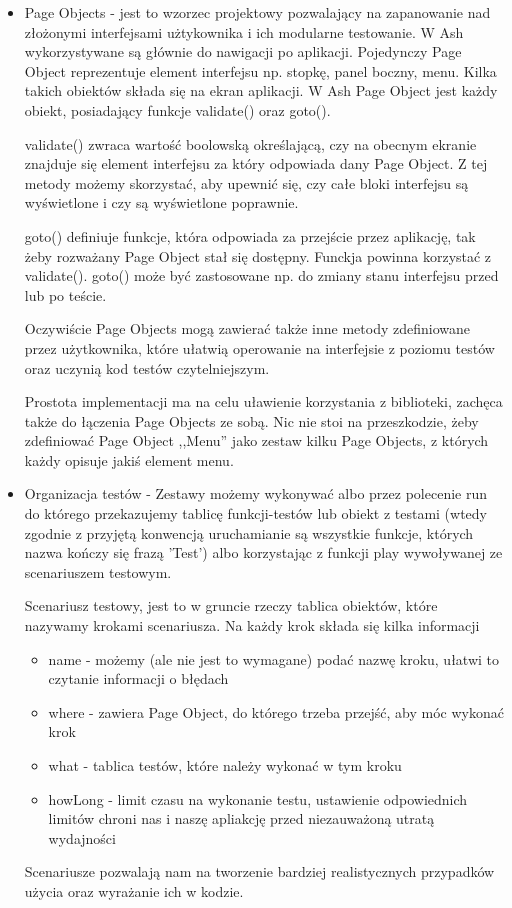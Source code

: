 \documentclass[brudnopis]{xmgr}
\begin{document}
\begin{itemize}
  \item Page Objects - jest to wzorzec projektowy pozwalający na zapanowanie nad złożonymi interfejsami użtykownika i ich modularne testowanie. W Ash wykorzystywane są głównie do nawigacji po aplikacji. Pojedynczy Page Object reprezentuje element interfejsu np. stopkę, panel boczny, menu. Kilka takich obiektów składa się na ekran aplikacji. W Ash Page Object jest każdy obiekt, posiadający funkcje validate() oraz goto().

validate() zwraca wartość boolowską określającą, czy na obecnym ekranie znajduje się element interfejsu za który odpowiada dany Page Object. Z tej metody możemy skorzystać, aby upewnić się, czy całe bloki interfejsu są wyświetlone i czy są wyświetlone poprawnie.

goto() definiuje funkcje, która odpowiada za przejście przez aplikację, tak żeby rozważany Page Object stał się dostępny. Funckja powinna korzystać z validate(). goto() może być zastosowane np. do zmiany stanu interfejsu przed lub po teście.

Oczywiście Page Objects mogą zawierać także inne metody zdefiniowane przez użytkownika, które ułatwią operowanie na interfejsie z poziomu testów oraz uczynią kod testów czytelniejszym.

Prostota implementacji ma na celu uławienie korzystania z biblioteki, zachęca także do łączenia Page Objects ze sobą. Nic nie stoi na przeszkodzie, żeby zdefiniować Page Object ,,Menu'' jako zestaw kilku Page Objects, z których każdy opisuje jakiś element menu. 

 \item Organizacja testów - Zestawy możemy wykonywać albo przez polecenie run do którego przekazujemy tablicę funkcji-testów lub obiekt z testami (wtedy zgodnie z przyjętą konwencją uruchamianie są wszystkie funkcje, których nazwa kończy się frazą 'Test') albo korzystając z funkcji play wywoływanej ze scenariuszem testowym.

Scenariusz testowy, jest to w gruncie rzeczy tablica obiektów, które nazywamy krokami scenariusza. Na każdy krok składa się kilka informacji 

  \begin{itemize}
    \item name - możemy (ale nie jest to wymagane) podać nazwę kroku, ułatwi to czytanie informacji o błędach
    \item where - zawiera Page Object, do którego trzeba przejść, aby móc wykonać krok 
    \item what - tablica testów, które należy wykonać w tym kroku
    \item howLong - limit czasu na wykonanie testu, ustawienie odpowiednich limitów chroni nas i naszę apliakcję przed niezauważoną utratą wydajności
  \end{itemize}

Scenariusze pozwalają nam na tworzenie bardziej realistycznych przypadków użycia oraz wyrażanie ich w kodzie. 

\end{itemize}
\end{document}
